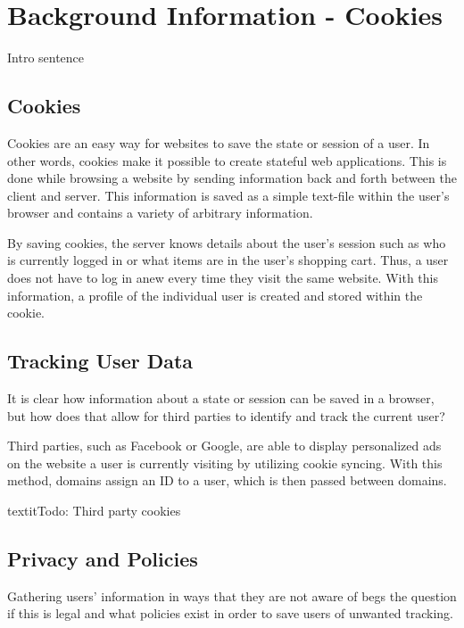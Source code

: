 \chapter{Background Information - Cookies}
\label{ch:bg_cookies}
Intro sentence


%
%
\section{Cookies}
\label{sec:bg_cookies:cookies}
Cookies are an easy way for websites to save the state or session of a user. In other words, cookies make it possible to create stateful web applications. This is done while browsing a website by sending information back and forth between the client and server. This information is saved as a simple text-file within the user's browser and contains a variety of arbitrary information. \cite{cookies1}

By saving cookies, the server knows details about the user's session such as who is currently logged in or what items are in the user's shopping cart. Thus, a user does not have to log in anew every time they visit the same website. With this information, a profile of the individual user is created and stored within the cookie. \cite{cookies1}



%
%
\section{Tracking User Data}
\label{sec:bg_cookies:data}
It is clear how information about a state or session can be saved in a browser, but how does that allow for third parties to identify and track the current user?

Third parties, such as Facebook or Google, are able to display personalized ads on the website a user is currently visiting by utilizing cookie syncing. With this method, domains assign an ID to a user, which is then passed between domains. \cite{cookies2}

textit{\color{red}Todo: Third party cookies}

%
%
\section{Privacy and Policies}
\label{sec:bg_cookies:privacy}

Gathering users' information in ways that they are not aware of begs the question if this is legal and what policies exist in order to save users of unwanted tracking.

